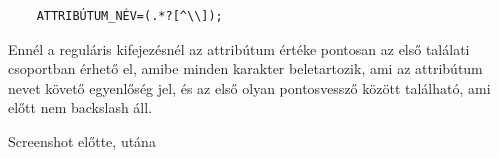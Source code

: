 \begin{lstlisting}
	ATTRIBÚTUM_NÉV=(.*?[^\\]);
\end{lstlisting}

Ennél a reguláris kifejezésnél az attribútum értéke pontosan az első találati csoportban érhető el, amibe minden karakter beletartozik, ami az attribútum nevet követő egyenlőség jel, és az első olyan pontosvessző között található, ami előtt nem backslash áll.

\todo Screenshot előtte, utána\\
